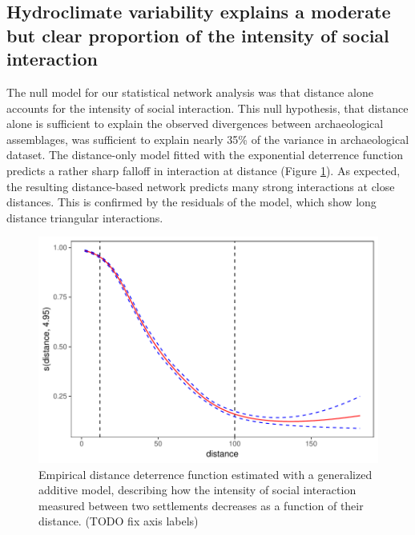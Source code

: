 \documentclass[10pt]{iopart}
\begin{document}
\subsection*{Hydroclimate variability explains a moderate but clear proportion of the intensity of social interaction}
The null model for our statistical network analysis was that distance alone accounts for the intensity of social interaction. This null hypothesis, that distance alone is sufficient to explain the observed divergences between archaeological assemblages, was sufficient to explain nearly 35\% of the variance in archaeological dataset. The distance-only model fitted with the exponential deterrence function predicts a rather sharp falloff in interaction at distance (Figure \ref{fig:distance}). As expected, the resulting distance-based network predicts many strong interactions at close distances. This is confirmed by the residuals of the model, which show long distance triangular interactions.

\begin{figure}[!htbp]
\centering
\includegraphics[width=\linewidth]{figures/distance_function.pdf}
\caption{Empirical distance deterrence function estimated with a generalized additive model, describing how the intensity of social interaction measured between two settlements decreases as a function of their distance.  (TODO fix axis labels)}
\label{fig:distance}
\end{figure}
\end{document}
